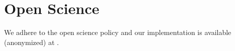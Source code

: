 \section{Open Science}
%
We adhere to the open science policy and our implementation is available (anonymized) at \cite{code}. 









%
%
%
%
%


